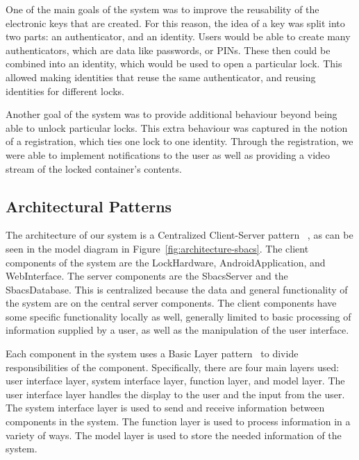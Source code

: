 \documentclass[12pt]{report}
\let\Oldsubsection\subsection
\renewcommand{\subsection}{\FloatBarrier\Oldsubsection}
\begin{document}
One of the main goals of the system was to improve the reusability of the electronic keys that are created. For this
reason, the idea of a key was split into two parts: an authenticator, and an identity. Users would be able to create
many authenticators, which are data like passwords, or PINs. These then could be combined into an identity, which
would be used to open a particular lock. This allowed making identities that reuse the same authenticator, and reusing
identities for different locks.

Another goal of the system was to provide additional behaviour beyond being able to unlock particular locks.
This extra behaviour was captured in the notion of a registration, which ties one lock to one identity. Through the
registration, we were able to implement notifications to the user as well as providing a video stream of the locked 
container's contents.


\subsection{Architectural Patterns} \label{architectural-patterns}


The architecture of our system is a Centralized Client-Server pattern ~\autocite{CLIENTSERVERARCH}, as can be seen 
in the model diagram in Figure~\ref{fig:architecture-sbacs}. The client components of
the system are the LockHardware, AndroidApplication, and WebInterface. The server components are the SbacsServer and
the SbacsDatabase. This is centralized because the data and general functionality of the system are on the central
server components. The client components have some specific functionality locally as well, generally limited to
basic processing of information supplied by a user, as well as the manipulation of the user interface.

Each component in the system uses a Basic Layer pattern~\autocite{LAYERPATTERNBOOK} to divide responsibilities of the component. Specifically,
there are four main layers used: user interface layer, system interface layer, function layer, and model layer.
The user interface layer handles the display to the user and the input from the user. The system interface layer
is used to send and receive information between components in the system. The function layer is used to process
information in a variety of ways. The model layer is used to store the needed information of the system.
\end{document}
